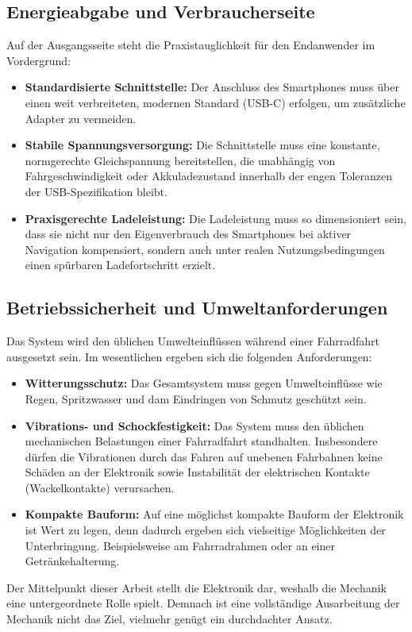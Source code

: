 \documentclass[12pt,a4paper]{article}
\begin{document}
\subsection{Energieabgabe und Verbraucherseite}
Auf der Ausgangsseite steht die Praxistauglichkeit für den Endanwender im Vordergrund:
\begin{itemize}
    \item \textbf{Standardisierte Schnittstelle:} 
    Der Anschluss des Smartphones muss über einen weit verbreiteten, modernen Standard 
    (USB-C) erfolgen, um zusätzliche Adapter zu vermeiden.
    \item \textbf{Stabile Spannungsversorgung:} 
    Die Schnittstelle muss eine konstante, normgerechte Gleichspannung bereitstellen, die unabhängig von 
    Fahrgeschwindigkeit oder Akkuladezustand innerhalb der engen Toleranzen der USB-Spezifikation bleibt.
    \item \textbf{Praxisgerechte Ladeleistung:} 
    Die Ladeleistung muss so dimensioniert sein, dass sie nicht nur den Eigenverbrauch des Smartphones bei 
    aktiver Navigation kompensiert, sondern auch unter realen Nutzungsbedingungen einen spürbaren Ladefortschritt erzielt.
\end{itemize}

\subsection{Betriebssicherheit und Umweltanforderungen}
Das System wird den üblichen Umwelteinflüssen während einer Fahrradfahrt ausgesetzt sein. Im wesentlichen ergeben sich die folgenden Anforderungen:
\begin{itemize}
    \item \textbf{Witterungsschutz:} 
    Das Gesamtsystem muss gegen Umwelteinflüsse wie Regen, Spritzwasser und dam Eindringen von Schmutz geschützt sein.
    \item \textbf{Vibrations- und Schockfestigkeit:}
    Das System muss den üblichen mechanischen Belastungen einer Fahrradfahrt standhalten. Insbesondere dürfen die 
    Vibrationen durch das Fahren auf unebenen Fahrbahnen keine Schäden an der Elektronik sowie Instabilität der elektrischen 
    Kontakte (Wackelkontakte) verursachen.
    \item \textbf{Kompakte Bauform:} 
    Auf eine möglichst kompakte Bauform der Elektronik ist Wert zu legen, denn dadurch ergeben sich vielseitige Möglichkeiten der Unterbringung. 
    Beispielsweise am Fahrradrahmen oder an einer Getränkehalterung. 
\end{itemize}
Der Mittelpunkt dieser Arbeit stellt die Elektronik dar, weshalb die Mechanik eine untergeordnete Rolle spielt. 
Demnach ist eine vollständige Ausarbeitung der Mechanik nicht das Ziel, vielmehr genügt ein durchdachter Ansatz.
\end{document}
